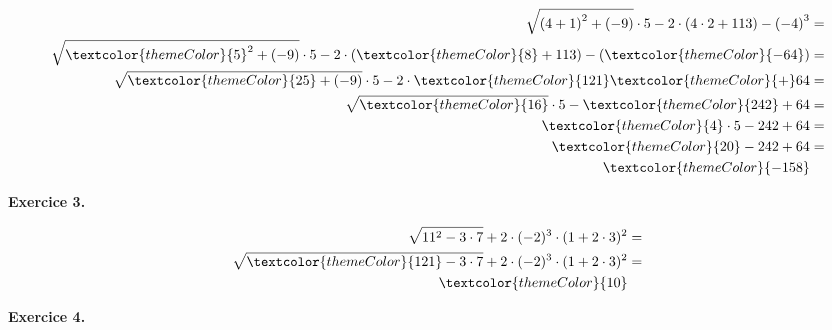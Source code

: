 {\vspace{-30pt}\color{black}
\begin{align*}
\sqrt{\left(4 + 1\right)^2 + \left(-9\right)} \cdot 5 - 2 \cdot \left(4 \cdot 2 + 113\right) - \left(-4\right)^3 &= \\
\sqrt{\textcolor{themeColor}{5}^2 + \left(-9\right)} \cdot 5 - 2 \cdot \left(\textcolor{themeColor}{8} + 113\right) - \left(\textcolor{themeColor}{-64}\right) &= \\
\sqrt{\textcolor{themeColor}{25} + \left(-9\right)} \cdot 5 - 2 \cdot \textcolor{themeColor}{121} \textcolor{themeColor}{+}64 &= \\
\sqrt{\textcolor{themeColor}{16}} \cdot 5 - \textcolor{themeColor}{242} + 64 &= \\
\textcolor{themeColor}{4}\cdot5 - 242 +64 &= \\
\textcolor{themeColor}{20} - 242 +64 &= \\
\textcolor{themeColor}{-158}
\end{align*}
}

\newpage
{\bfseries\color{themeColor}Exercice 3.} 

{\vspace{-30pt}\color{black}
\begin{align*}
\sqrt{11^2 - 3 \cdot 7} + 2 \cdot (-2)^3 \cdot (1 + 2 \cdot 3)^2 &= \\
\sqrt{\textcolor{themeColor}{121} - 3 \cdot 7} + 2 \cdot (-2)^3 \cdot (1 + 2 \cdot 3)^2 &= \\
\textcolor{themeColor}{10}
\end{align*}
}

\vspace{30pt}
{\bfseries\color{themeColor}Exercice 4.} 

